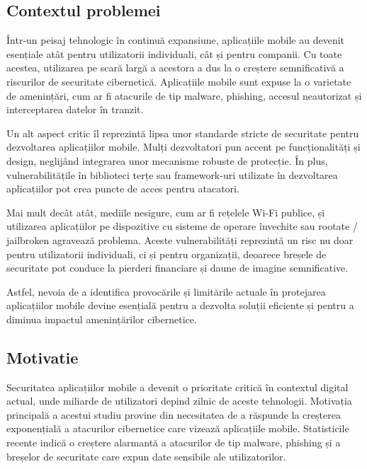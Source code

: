\documentclass[runningheads]{llncs}
\begin{document}
\subsection{Contextul problemei}
Într-un peisaj tehnologic în continuă expansiune, aplicațiile mobile au devenit esențiale atât pentru utilizatorii individuali, cât și pentru companii. Cu toate acestea, utilizarea pe scară largă a acestora a dus la o creștere semnificativă a riscurilor de securitate cibernetică. Aplicațiile mobile sunt expuse la o varietate de amenințări, cum ar fi atacurile de tip malware, phishing, accesul neautorizat și interceptarea datelor în tranzit.

Un alt aspect critic îl reprezintă lipsa unor standarde stricte de securitate pentru dezvoltarea aplicațiilor mobile. Mulți dezvoltatori pun accent pe funcționalități și design, neglijând integrarea unor mecanisme robuste de protecție. În plus, vulnerabilitățile în biblioteci terțe sau framework-uri utilizate în dezvoltarea aplicațiilor pot crea puncte de acces pentru atacatori.

Mai mult decât atât, mediile nesigure, cum ar fi rețelele Wi-Fi publice, și utilizarea aplicațiilor pe dispozitive cu sisteme de operare învechite sau rootate / jailbroken agravează problema. Aceste vulnerabilități reprezintă un risc nu doar pentru utilizatorii individuali, ci și pentru organizații, deoarece breșele de securitate pot conduce la pierderi financiare și daune de imagine semnificative.

Astfel, nevoia de a identifica provocările și limitările actuale în protejarea aplicațiilor mobile devine esențială pentru a dezvolta soluții eficiente și pentru a diminua impactul amenințărilor cibernetice.

\subsection{Motivatie}
Securitatea aplicațiilor mobile a devenit o prioritate critică în contextul digital actual, unde miliarde de utilizatori depind zilnic de aceste tehnologii. Motivația principală a acestui studiu provine din necesitatea de a răspunde la creșterea exponențială a atacurilor cibernetice care vizează aplicațiile mobile. Statisticile recente indică o creștere alarmantă a atacurilor de tip malware, phishing și a breșelor de securitate care expun date sensibile ale utilizatorilor.
\end{document}
